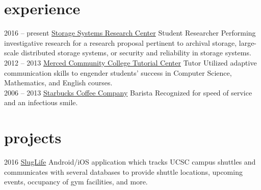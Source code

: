 \documentclass[]{./friggeri-cv}
\begin{document}
\section{experience}
\begin{entrylist}
\entry
    {2016 -- present}
    {\href{http://www.ssrc.ucsc.edu/index.html}{Storage Systems Research Center}}
    {Student Researcher}
    {Performing investigative research for a 
    research proposal pertinent to archival storage, large-scale distributed 
    storage systems, or security and reliability in storage systems.}  
\\\entry
    {2012 -- 2013}
    {\href{http://www.mccd.edu/resources/tutoring/tutorial-center.html}{Merced Community College Tutorial Center}}
    {Tutor}
    {Utilized adaptive communication skills to engender students' success in Computer Science, Mathematics, and English courses.}
\\\entry
    {2006 -- 2013}
    {\href{http://wisequacks.org/wp2/wp-content/uploads/2012/05/coffee.jpg}{Starbucks Coffee Company}}
    {Barista}
    {Recognized for speed of service and an infectious smile.}
\end{entrylist}

\section{projects}
\begin{entrylist}
  \entry
    {2016}
    {\href{https://sites.google.com/a/ucsc.edu/sluglife/}{SlugLife}}
    {}
    {Android/iOS application which tracks UCSC campus shuttles and
    communicates with several databases to provide shuttle locations, upcoming
    events, occupancy of gym facilities, and more.}
\end{entrylist}
\end{document}

